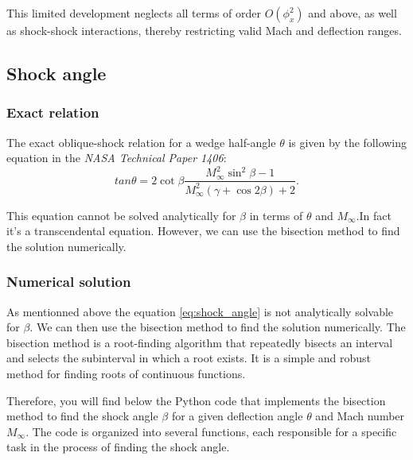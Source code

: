 This limited development neglects all terms of order \(O(\phi_x^2)\) and above, as well as shock-shock interactions, thereby restricting valid Mach and deflection ranges.


\subsection{Shock angle}

\subsubsection{Exact relation}
The exact oblique-shock relation for a wedge half-angle \(\theta\) is given by the following equation in the \textit{NASA Technical Paper 1406}:
\begin{equation}
	tan\theta = 2\cot\beta\frac{M_\infty^2\sin^2\beta - 1}{M_\infty^2(\gamma+\cos2\beta)+2}.
\end{equation}
\label{eq:shock_angle}

This equation cannot be solved analytically for \(\beta\) in terms of \(\theta\) and \(M_\infty\).In fact it's a transcendental equation. However, we can use the bisection method to find the solution numerically. 

\subsubsection{Numerical solution}
As mentionned above the equation \ref{eq:shock_angle} is not analytically solvable for \(\beta\). We can then use the bisection method to find the solution numerically. The bisection method is a root-finding algorithm that repeatedly bisects an interval and selects the subinterval in which a root exists. It is a simple and robust method for finding roots of continuous functions.

Therefore, you will find below the Python code that implements the bisection method to find the shock angle \(\beta\) for a given deflection angle \(\theta\) and Mach number \(M_\infty\). The code is organized into several functions, each responsible for a specific task in the process of finding the shock angle.

